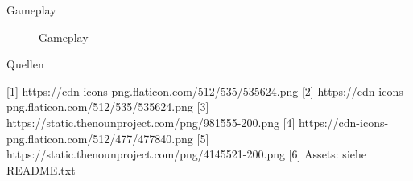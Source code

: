 \documentclass{beamer}
\begin{document}
\begin{frame}{Gameplay}
\begin{figure}
    \centering
\caption{Gameplay}
\end{figure}
\end{frame}


\begin{frame}{Quellen}
	\begin{thebibliography}{1}
[1]{ https://cdn-icons-png.flaticon.com/512/535/535624.png }
[2]{ https://cdn-icons-png.flaticon.com/512/535/535624.png }
[3]{ https://static.thenounproject.com/png/981555-200.png }
[4]{ https://cdn-icons-png.flaticon.com/512/477/477840.png }
[5]{ https://static.thenounproject.com/png/4145521-200.png }
[6]{ Assets: siehe README.txt}
\end{thebibliography}
\end{frame}


	
    	
    	
    	
\end{document}
